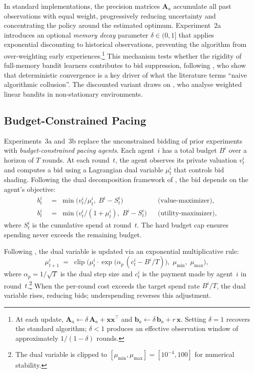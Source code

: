 In standard implementations, the precision matrices $\mathbf{A}_a$ accumulate all past observations with equal weight, progressively reducing uncertainty and concentrating the policy around the estimated optimum. Experiment~2a introduces an optional \emph{memory decay} parameter $\delta \in (0,1]$ that applies exponential discounting to historical observations, preventing the algorithm from over-weighting early experiences.\footnote{At each update, $\mathbf{A}_a \leftarrow \delta\,\mathbf{A}_a + \mathbf{x}\mathbf{x}^\top$ and $\mathbf{b}_a \leftarrow \delta\,\mathbf{b}_a + r\,\mathbf{x}$. Setting $\delta = 1$ recovers the standard algorithm; $\delta < 1$ produces an effective observation window of approximately $1/(1-\delta)$ rounds.} This mechanism tests whether the rigidity of full-memory bandit learners contributes to bid suppression, following \citet{Douglas2024}, who show that deterministic convergence is a key driver of what the literature terms ``naive algorithmic collusion''. The discounted variant draws on \citet{Russac2019}, who analyse weighted linear bandits in non-stationary environments.

\subsection{Budget-Constrained Pacing}
\label{sec:pacing}

Experiments~3a and~3b replace the unconstrained bidding of prior experiments with \emph{budget-constrained pacing agents}. Each agent~$i$ has a total budget $B^i$ over a horizon of $T$ rounds. At each round~$t$, the agent observes its private valuation $v_t^i$ and computes a bid using a Lagrangian dual variable $\mu_t^i$ that controls bid shading. Following the dual decomposition framework of \citet{Balseiro2019Learning}, the bid depends on the agent's objective:
\begin{align}
b_t^i &\;=\; \min\!\bigl(v_t^i / \mu_t^i,\; B^i - S_t^i\bigr) & &\text{(value-maximizer),} \label{eq:bid_vmax_algo}\\
b_t^i &\;=\; \min\!\bigl(v_t^i / (1 + \mu_t^i),\; B^i - S_t^i\bigr) & &\text{(utility-maximizer),} \label{eq:bid_umax_algo}
\end{align}
where $S_t^i$ is the cumulative spend at round~$t$. The hard budget cap ensures spending never exceeds the remaining budget.

Following \citet{Balseiro2019Learning}, the dual variable is updated via an exponential multiplicative rule:
\begin{equation}
\mu_{t+1}^i \;=\; \operatorname{clip}\!\bigl(\mu_t^i \cdot \exp\!\bigl(\alpha_p\,(c_t^i - B^i/T)\bigr),\; \mu_{\min},\; \mu_{\max}\bigr),
\label{eq:dual_update}
\end{equation}
where $\alpha_p = 1/\!\sqrt{T}$ is the dual step size and $c_t^i$ is the payment made by agent~$i$ in round~$t$.\footnote{The dual variable is clipped to $[\mu_{\min}, \mu_{\max}] = [10^{-4}, 100]$ for numerical stability.} When the per-round cost exceeds the target spend rate $B^i/T$, the dual variable rises, reducing bids; underspending reverses this adjustment.


